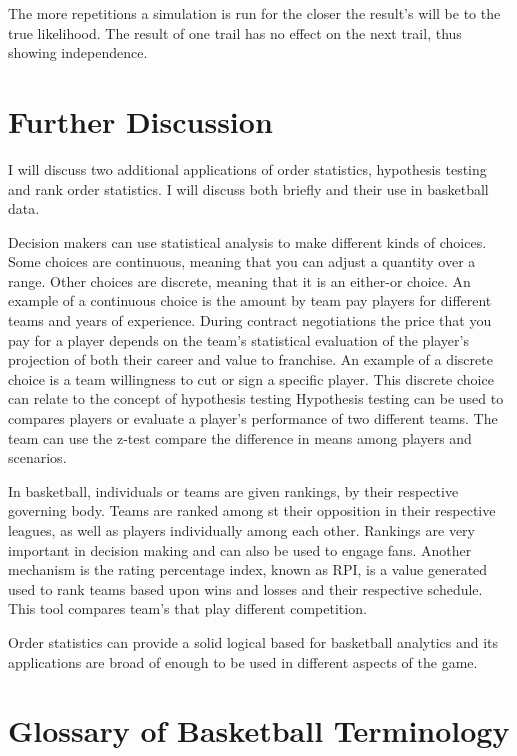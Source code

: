 \documentclass[11pt,a4paper]{article}
\theoremstyle{plain}
\begin{document}
The more repetitions a simulation is run for the closer the result's will be to the true likelihood. 
The result of one trail has no effect on the next trail, thus showing independence.


\newpage
\section*{Further Discussion}
I will discuss two additional applications of order statistics, hypothesis testing and rank order statistics. I will discuss both briefly and their use in basketball data. 

Decision makers can use statistical analysis to make different kinds of choices. Some choices are continuous, meaning that you can adjust a quantity over a range. Other choices are discrete, meaning that it is an either-or choice. 
An example of a continuous choice is the amount  by team pay players for different teams and years of experience. During contract negotiations the price that you pay for a player depends on the team's statistical evaluation of the player's projection of both their career and value to franchise. 
An example of a discrete choice is a team willingness to cut or sign a specific player. This discrete choice can relate to the concept of hypothesis testing
Hypothesis testing can be used to compares players or evaluate a player's performance of two different teams. The team can use the z-test compare the difference in means among players and scenarios. 


In basketball, individuals or teams are given rankings,  by their respective governing body. Teams are ranked among st their opposition in their respective leagues, as well as players individually among each other. Rankings are very important in decision making and can also be used to engage fans. Another mechanism is the rating percentage index, known as RPI, is a value generated used to rank teams based upon wins and losses and their respective schedule. This tool compares team's that play different competition.

Order statistics can provide a solid logical based for basketball analytics and its applications are broad of enough to be used in different aspects of the game.



\newpage
\section*{Glossary of Basketball Terminology}
\end{document}
